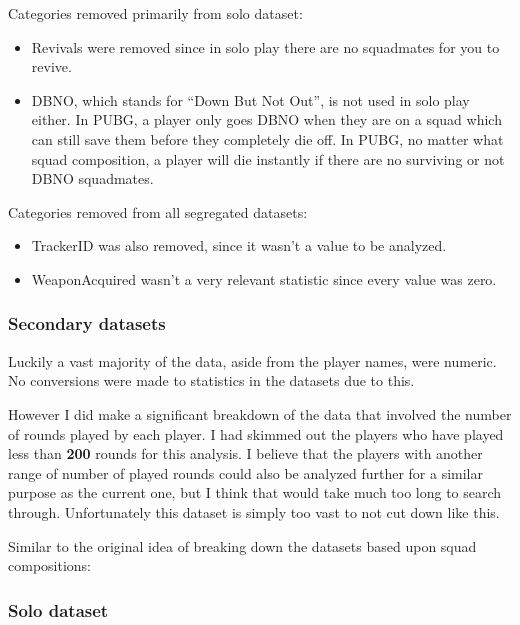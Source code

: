 \documentclass[]{article}
\begin{document}
Categories removed primarily from solo dataset:

\begin{itemize}
\item
  Revivals were removed since in solo play there are no squadmates for
  you to revive.
\item
  DBNO, which stands for ``Down But Not Out'', is not used in solo play
  either. In PUBG, a player only goes DBNO when they are on a squad
  which can still save them before they completely die off. In PUBG, no
  matter what squad composition, a player will die instantly if there
  are no surviving or not DBNO squadmates.
\end{itemize}

Categories removed from all segregated datasets:

\begin{itemize}
\item
  TrackerID was also removed, since it wasn't a value to be analyzed.
\item
  WeaponAcquired wasn't a very relevant statistic since every value was
  zero.
\end{itemize}

\subsubsection{Secondary datasets}\label{secondary-datasets}

Luckily a vast majority of the data, aside from the player names, were
numeric. No conversions were made to statistics in the datasets due to
this.

However I did make a significant breakdown of the data that involved the
number of rounds played by each player. I had skimmed out the players
who have played less than \textbf{200} rounds for this analysis. I
believe that the players with another range of number of played rounds
could also be analyzed further for a similar purpose as the current one,
but I think that would take much too long to search through.
Unfortunately this dataset is simply too vast to not cut down like this.

Similar to the original idea of breaking down the datasets based upon
squad compositions:

\subsubsection{Solo dataset}\label{solo-dataset}
\end{document}
